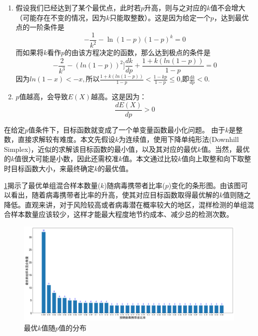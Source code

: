 \documentclass[withoutpre]{cumcmthesis} %
\begin{document}
\begin{enumerate}
    \item 假设我们已经达到了某个最优点，此时若$p$升高，则与之对应的$k$值不会增大（可能存在不变的情况，因为$k$只能取整数）。这是因为给定一个$p$，达到最优点的一阶条件是
    \begin{equation}
        -\frac{1}{k^2}-\ln(1-p)(1-p)^k=0
    \end{equation}
    而如果将$k$看作$p$的由该方程决定的函数，那么达到极点的条件是
    \begin{equation}
        -\frac{2}{k^3}-(ln(1-p))^2]\frac{dk}{dp}+\frac{1+k(ln(1-p))}{1-p}=0
    \end{equation}
    因为$ln(1-x)<-x,$所以$\displaystyle\frac{1+k(ln(1-p))}{1-p}<\frac{1-kp}{1-p}\leqslant0$,即$\displaystyle\frac{dk}{dp}<0.$
    \item $p$值越高，会导致$E(X)$越高。这是因为：
    \begin{equation}
        \displaystyle\frac{dE(X)}{dp}>0
    \end{equation}          
\end{enumerate}


在给定$p$值条件下，目标函数\label{equation:target}就变成了一个单变量函数最小化问题。
由于$k$是整数，直接求解较有难度。本文先假设$k$为连续值，使用下降单纯形法(Downhill Simplex)，近似的求解该目标函数的最小值，以及其对应的最优$k$值。当然，最优的$k$值很大可能是小数，因此还需校准$k$值。本文通过比较$k$值向上取整和向下取整时目标函数大小，来最终确定$k$的最优值。


\cref{fig:k}揭示了最优单组混合样本数量($k$)随病毒携带者比率($p$)变化的条形图。由该图可以看出，随着病毒携带者比率的升高，使其对应目标函数取得最优解的$k$值则随之降低。直观来讲，对于风险较高或者病毒潜在概率较大的地区，混样检测的单组混合样本数量应该较少，这样才能最大程度地节约成本、减少总的检测次数。
\begin{figure}[!h]
    \centering
    \includegraphics[width=1.0\textwidth]{figures/optimize_pool_size.png}
    \caption{最优$k$值随$p$值的分布}
    \label{fig:k}
\end{figure}
\end{document}
